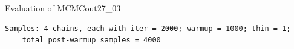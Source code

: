 \begin{Rscreen}{Evaluation of MCMC}{out27_03}
   \begin{verbatim}
Samples: 4 chains, each with iter = 2000; warmup = 1000; thin = 1;
    total post-warmup samples = 4000
\end{verbatim}
\end{Rscreen}
